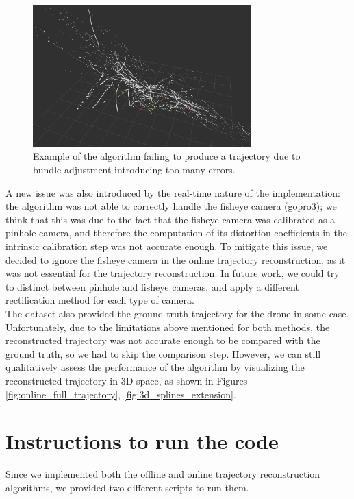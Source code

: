 \documentclass[11pt]{article}
\begin{document}
\begin{figure}[h]
    \centering
    \includegraphics[width=0.75\textwidth]{imgs/online_failed_due_to_ba.png}
    \caption{Example of the algorithm failing to produce a trajectory due to bundle adjustment introducing too many errors.}
    \label{fig:bad_ba_online_failed}
\end{figure}

A new issue was also introduced by the real-time nature of the implementation: the algorithm was not able to correctly handle the fisheye camera (gopro3); we think that this was due to the fact that the fisheye camera was calibrated as a pinhole camera, and therefore the computation of its distortion coefficients in the intrinsic calibration step was not accurate enough. To mitigate this issue, we decided to ignore the fisheye camera in the online trajectory reconstruction, as it was not essential for the trajectory reconstruction. In future work, we could try to distinct between pinhole and fisheye cameras, and apply a different rectification method for each type of camera.\\

The dataset also provided the ground truth trajectory for the drone in some case. Unfortunately, due to the limitations above mentioned for both methods, the reconstructed trajectory was not accurate enough to be compared with the ground truth, so we had to skip the comparison step. However, we can still qualitatively assess the performance of the algorithm by visualizing the reconstructed trajectory in 3D space, as shown in Figures \ref{fig:online_full_trajectory}, \ref{fig:3d_splines_extension}.

\section{Instructions to run the code}

Since we implemented both the offline and online trajectory reconstruction algorithms, we provided two different scripts to run them.
\end{document}
